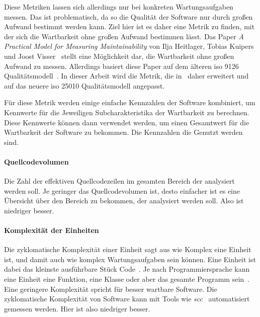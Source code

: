 \documentclass[12pt, a4paper, ngerman]{article}
\begin{document}
Diese Metriken lassen sich allerdings nur bei konkreten Wartungsaufgaben messen.
Das ist problematisch, da so die Qualität der Software nur durch großen Aufwand bestimmt werden kann.
Ziel hier ist es daher eine Metrik zu finden, mit der sich die Wartbarkeit ohne großen Aufwand bestimmen lässt.
Das Paper \emph{A Practical Model for Measuring Maintainability} von Ilja Heitlager, Tobias Kuipers und Joost Visser~\cite{maintainability_metrics}
stellt eine Möglichkeit dar, die Wartbarkeit ohne großen Aufwand zu messen.
Allerdings basiert diese Paper auf dem älteren \ac{iso} 9126 Qualitätsmodell~\cite{maintainability_metrics,ISO9126}.
In dieser Arbeit wird die Metrik, die in~\cite{maintainability_metrics} daher erweitert
und auf das neuere \ac{iso} 25010 Qualitätsmodell angepasst.

Für diese Metrik werden einige einfache Kennzahlen der Software kombiniert,
um Kennwerte für die Jeweiligen Subcharakteristika der Wartbarkeit zu berechnen.
Diese Kennwerte können dann verwendet werden, um einen Gesamtwert
für die Wartbarkeit der Software zu bekommen.
Die Kennzahlen die Genutzt werden sind.

\paragraph{Quellcodevolumen}

Die Zahl der effektiven Quellcodezeilen im gesamten Bereich der analysiert werden soll.
Je geringer das Quellcodevolumen ist,
desto einfacher ist es eine Übersicht über den Bereich zu bekommen,
der analysiert werden soll.
Also ist niedriger besser.

\paragraph{Komplexität der Einheiten}

Die zyklomatische Komplexität einer Einheit sagt aus wie Komplex eine Einheit ist,
und damit auch wie komplex Wartungsaufgaben sein können.
Eine Einheit ist dabei das kleinste ausführbare Stück Code~\cite{maintainability_metrics}.
Je nach Programmiersprache kann eine Einheit eine Funktion, eine Klasse oder aber das gesamte Programm sein~\cite{maintainability_metrics}.
Eine geringere Komplexität spricht für besser wartbare Software.
Die zyklomatische Komplexität von Software kann mit Tools
wie \emph{scc}~\cite{scc} automatisiert gemessen werden.
Hier ist also niedriger besser.
\end{document}
